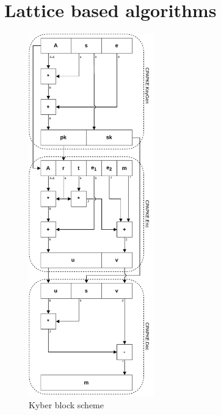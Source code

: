 \chapter{Lattice based algorithms}
\label{ch:block_diagrams}

\begin{figure}[ht!]
  \centering
  \includegraphics[width=0.484\textwidth]{pictures/kyber_all.pdf}
  \caption{Kyber block scheme}
  \label{img:kyber_all}
\end{figure}

